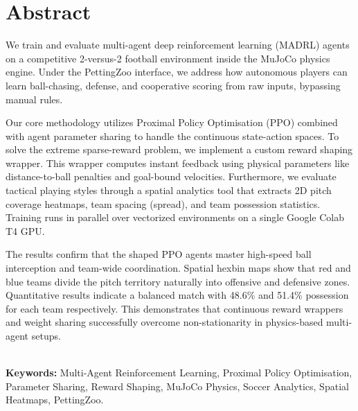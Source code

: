 \chapter*{\center \Large  Abstract}

We train and evaluate multi-agent deep reinforcement learning (MADRL) agents on a competitive 2-versus-2 football environment inside the MuJoCo physics engine. Under the PettingZoo interface, we address how autonomous players can learn ball-chasing, defense, and cooperative scoring from raw inputs, bypassing manual rules. 

Our core methodology utilizes Proximal Policy Optimisation (PPO) combined with agent parameter sharing to handle the continuous state-action spaces. To solve the extreme sparse-reward problem, we implement a custom reward shaping wrapper. This wrapper computes instant feedback using physical parameters like distance-to-ball penalties and goal-bound velocities. Furthermore, we evaluate tactical playing styles through a spatial analytics tool that extracts 2D pitch coverage heatmaps, team spacing (spread), and team possession statistics. Training runs in parallel over vectorized environments on a single Google Colab T4 GPU.

The results confirm that the shaped PPO agents master high-speed ball interception and team-wide coordination. Spatial hexbin maps show that red and blue teams divide the pitch territory naturally into offensive and defensive zones. Quantitative results indicate a balanced match with 48.6\% and 51.4\% possession for each team respectively. This demonstrates that continuous reward wrappers and weight sharing successfully overcome non-stationarity in physics-based multi-agent setups.

~\\[1cm]
\noindent
\textbf{Keywords:} Multi-Agent Reinforcement Learning, Proximal Policy Optimisation, Parameter Sharing, Reward Shaping, MuJoCo Physics, Soccer Analytics, Spatial Heatmaps, PettingZoo.
